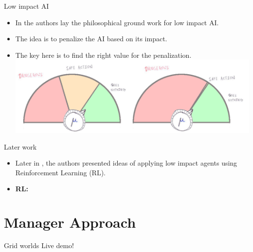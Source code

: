 \documentclass[10pt]{beamer}
\begin{document}
\begin{frame}{Low impact AI}
  \begin{itemize}[<+- | alert@+>]
    \item In \citet{ArmstrongLevinstein} the authors lay the philosophical ground work for low impact AI. 
    \item The idea is to penalize the AI based on its impact.
    \item The key here is to find the right value for the penalization.\\
    \includegraphics[scale=0.2]{images/dial.png}
  \end{itemize}
  
\end{frame}

\begin{frame}{Later work}
  \begin{itemize}[<+- | alert@+>]
    \item Later in \citet{Turner20, Krakovna19}, the authors presented ideas of applying low impact agents using Reinforcement Learning (RL).
    \item \textbf{RL:}\\
  \end{itemize}
\end{frame}


\section{Manager Approach}

\begin{frame}{Grid worlds}
  \centering
  \Huge{Live demo!}
\end{frame}
\end{document}

